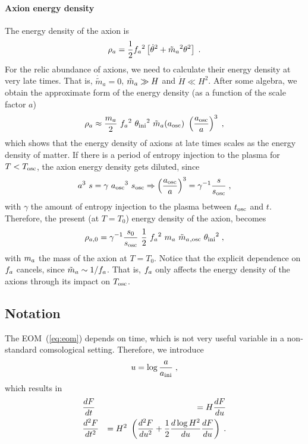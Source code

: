 \documentclass[11pt,a4paper]{article}
\begin{document}
\paragraph{Axion energy density}
%
The energy density of the axion is 
%
\begin{eqnarray}
	\rho_{a} = \dfrac{1}{2} f_{a}{}^2 \left[  \dot{\theta}^2 + \tilde m_{a}{}^2 \theta^2  \right] \;.
	\label{eq:rho_a_def} 
\end{eqnarray}
%
For the relic abundance of axions, we need to calculate their energy density at very late times. That is, $\dot{\tilde{m}}_a = 0$, $\tilde m_{a}{} \gg H$ and $\dot H \ll H^2$. After some algebra, we obtain the approximate form of the energy density (as a function of the scale factor $a$) 
%
\begin{eqnarray}
	\rho_{a} \approx \dfrac{m_{a}{} }{2}  \ f_{a}{}^2 \ \theta_{\rm ini}{}^2  \ \tilde m_{a}{}(a_{\rm osc}{}) \ \left( \dfrac{a_{\rm osc}{}}{a} \right)^3 \;,
	\label{eq:rho_a0} 
\end{eqnarray}
%
which shows that the energy density of axions at late times scales as the energy density of matter. If there is a period of entropy injection to the plasma for $T<T_{\rm osc}{}$, the axion energy density gets diluted, since 
%
\begin{equation}
	a^3 \ s = \gamma \ \aosc^3 \ s_{\rm osc} \Rightarrow  \lrb{\dfrac{\aosc}{a}}^3 = \gamma^{-1} \dfrac{s}{s_{\rm osc}} \;,
\end{equation}
%
with $\gamma$ the amount of entropy injection to the plasma between $t_{\rm osc}{}$ and $t$. Therefore, the present (at $T=T_0$) energy density of the axion, becomes
%
\begin{eqnarray}
	\rho_{a,0} = \gamma^{-1}  \dfrac{s_0}{s_{\rm osc}} \  \dfrac{1 }{2}  \ f_{a}{}^2 \ m_{a}{} \ \tilde m_{a}{}_{,{\rm osc}} \ \theta_{\rm ini}{}^2    \;,
	\label{eq:rho_a_approx} 
\end{eqnarray}
with $m_{a}{}$ the mass of the axion at $T=T_0$. Notice that the explicit dependence on $f_{a}{}$ cancels, since $\tilde m_{a}{} \sim 1/f_{a}{}$. That is, $f_{a}{}$ only affects the energy density of the axions through its impact on $T_{\rm osc}{}$. 
%

\subsection{Notation}\label{sec:notation}
%
%
The EOM~(\ref{eq:eom}) depends on time, which is not very useful variable in a non-standard comsological setting. Therefore, we introduce 
%
\begin{eqnarray}
	u = \log \dfrac{a}{a_{\rm ini}{}} \;,
	\label{eq:natation}
\end{eqnarray}
%
which results in 
%
\begin{eqnarray}
	&\dfrac{d F}{dt} &=  H  \dfrac{d F}{du} 
	\nonumber \\
	&\dfrac{d^2 F}{dt^2} &= H^2 \ \left(  \dfrac{d^2 F}{du^2} + \dfrac{1}{2} \dfrac{d \log H^2}{du}  \dfrac{d F}{du}  \right)\;.
	\label{eq:deriv_u}
\end{eqnarray}
\end{document}
